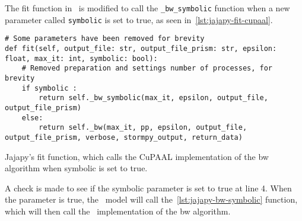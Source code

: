The fit function in \Jajapy\ is modified to call the \texttt{\_bw\_symbolic} function when a new parameter called \texttt{symbolic} is set to true, as seen in~\autoref{lst:jajapy-fit-cupaal}.


\begin{listing}
    \begin{verbatim}
# Some parameters have been removed for brevity
def fit(self, output_file: str, output_file_prism: str, epsilon: float, max_it: int, symbolic: bool):
    # Removed preparation and settings number of processes, for brevity
    if symbolic :
        return self._bw_symbolic(max_it, epsilon, output_file, output_file_prism)
    else:
        return self._bw(max_it, pp, epsilon, output_file, output_file_prism, verbose, stormpy_output, return_data)
      \end{verbatim}
    \caption{Jajapy's fit function, which calls the CuPAAL implementation of the \gls{bw} algorithm when symbolic is set to true.}
    \label{lst:jajapy-fit-cupaal}
\end{listing}

A check is made to see if the symbolic parameter is set to true at line 4. When the parameter is true, the \Jajapy\ model will call the~\autoref{lst:jajapy-bw-symbolic} function, which will then call the \Cupaal\ implementation of the \gls{bw} algorithm.
